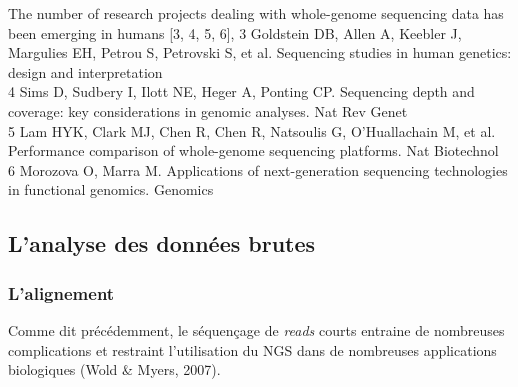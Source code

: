 \documentclass[12pt,twoside]{reedthesis}
\theoremstyle{definition}
\theoremstyle{definition}
\theoremstyle{remark}
\begin{document}
  The number of research projects dealing with whole-genome sequencing
  data has been emerging in humans {[}3, 4, 5, 6{]}, 3 Goldstein DB, Allen
  A, Keebler J, Margulies EH, Petrou S, Petrovski S, et al. Sequencing
  studies in human genetics: design and interpretation\\
  4 Sims D, Sudbery I, Ilott NE, Heger A, Ponting CP. Sequencing depth and
  coverage: key considerations in genomic analyses. Nat Rev Genet\\
  5 Lam HYK, Clark MJ, Chen R, Chen R, Natsoulis G, O'Huallachain M, et
  al. Performance comparison of whole-genome sequencing platforms. Nat
  Biotechnol\\
  6 Morozova O, Marra M. Applications of next-generation sequencing
  technologies in functional genomics. Genomics
  
  \subsection{L'analyse des données
  brutes}\label{lanalyse-des-donnees-brutes}
  
  \hypertarget{lalignement}{\subsubsection{L'alignement}\label{lalignement}}
  
  Comme dit précédemment, le séquençage de \emph{reads} courts entraine de
  nombreuses complications et restraint l'utilisation du NGS dans de
  nombreuses applications biologiques (Wold \& Myers, 2007).
  
\end{document}
